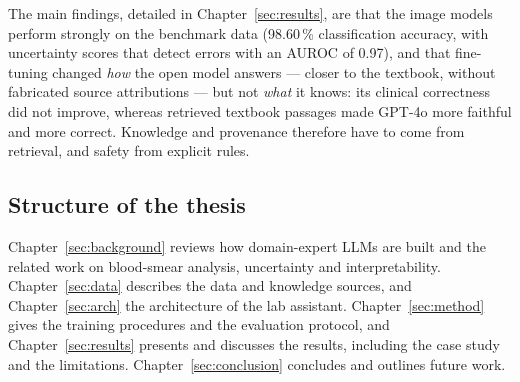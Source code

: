 The main findings, detailed in Chapter~\ref{sec:results}, are that the image models perform strongly on the benchmark data (98.60\,\% classification accuracy, with uncertainty scores that detect errors with an AUROC of 0.97), and that fine-tuning changed \emph{how} the open model answers --- closer to the textbook, without fabricated source attributions --- but not \emph{what} it knows: its clinical correctness did not improve, whereas retrieved textbook passages made GPT-4o more faithful and more correct. Knowledge and provenance therefore have to come from retrieval, and safety from explicit rules.

\subsection{Structure of the thesis}

Chapter~\ref{sec:background} reviews how domain-expert LLMs are built and the related work on blood-smear analysis, uncertainty and interpretability. Chapter~\ref{sec:data} describes the data and knowledge sources, and Chapter~\ref{sec:arch} the architecture of the lab assistant. Chapter~\ref{sec:method} gives the training procedures and the evaluation protocol, and Chapter~\ref{sec:results} presents and discusses the results, including the case study and the limitations. Chapter~\ref{sec:conclusion} concludes and outlines future work.

\clearpage
